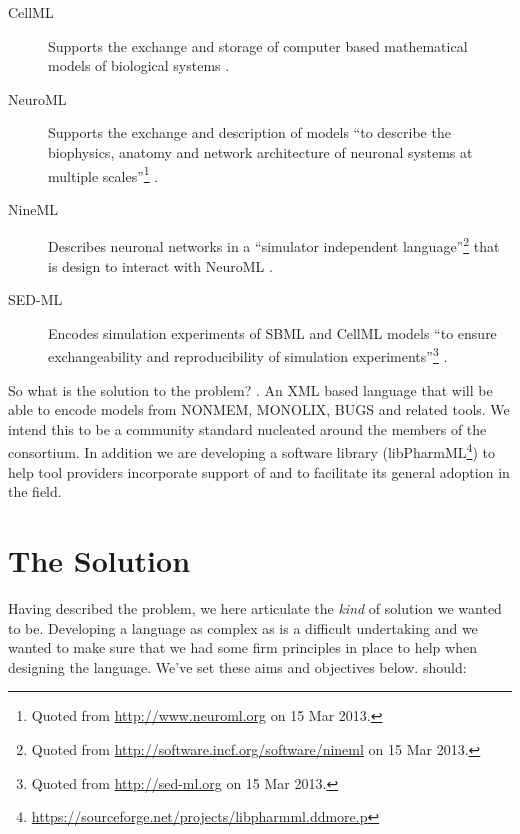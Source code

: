 \begin{description}
\item[CellML] Supports the exchange and storage of computer based mathematical models of 
biological systems \cite{CELLML}.
\item[NeuroML] Supports the exchange and description of models ``to describe the biophysics, 
anatomy and network architecture of neuronal systems at multiple scales''\footnote{Quoted 
from \url{http://www.neuroml.org} on 15 Mar 2013.} \cite{NeuroML}.
\item[NineML] Describes neuronal networks in a ``simulator independent 
language''\footnote{Quoted from \url{http://software.incf.org/software/nineml} on 
15 Mar 2013.} that is design to interact with NeuroML \cite{ninemlspec}.
\item[SED-ML] Encodes simulation experiments of SBML and CellML models 
``to ensure exchangeability and reproducibility of simulation 
experiments''\footnote{Quoted from \url{http://sed-ml.org} on 15 Mar 2013.} \cite{sedmll1v1}.
\end{description}

So what is the solution to the problem? \pharmml. An XML based language that 
will be able to encode models from NONMEM, MONOLIX, BUGS and related tools. 
We intend this to be a community standard nucleated around the members of the 
\ddmore consortium. In addition we are developing a software library 
(libPharmML\footnote{\url{https://sourceforge.net/projects/libpharmml.ddmore.p}}) 
to help tool providers incorporate support of \pharmml and to facilitate its
general adoption in the field.

\section{The Solution}
\label{intro:objectives}

Having described the problem, we here articulate the \emph{kind} of solution we wanted \pharmml to be.
Developing a language as complex as \pharmml is a difficult undertaking and we wanted to make sure
that we had some firm principles in place to help when designing the language. We've set these aims
and objectives below. \pharmml should:


